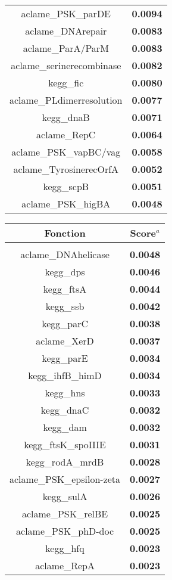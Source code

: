 \begin{table}[H]
\begin{minipage}[t]{0.3\textwidth}
\begin{scriptsize}
\begin{tabular}{c>{\bfseries}c}
aclame\_PSK\_parDE&0.0094\\
aclame\_DNArepair&0.0083\\
aclame\_ParA/ParM&0.0083\\
aclame\_serinerecombinase&0.0082\\
kegg\_fic&0.0080\\
aclame\_PLdimerresolution&0.0077\\
kegg\_dnaB&0.0071\\
aclame\_RepC&0.0064\\
aclame\_PSK\_vapBC/vag&0.0058\\
aclame\_TyrosinerecOrfA&0.0052\\
kegg\_scpB&0.0051\\
aclame\_PSK\_higBA&0.0048\\
\end{tabular}
\end{scriptsize}
\end{minipage}
\hspace{2cm}
\begin{minipage}[t]{0.3\textwidth}
\vspace{0cm}
\centering
\begin{scriptsize}
\begin{tabular}{c>{\bfseries}c}
Fonction & Score$^{a}$\\
\hline
\\[-0.2cm]
aclame\_DNAhelicase&0.0048\\
kegg\_dps&0.0046\\
kegg\_ftsA&0.0044\\
kegg\_ssb&0.0042\\
kegg\_parC&0.0038\\
aclame\_XerD&0.0037\\
kegg\_parE&0.0034\\
kegg\_ihfB\_himD&0.0034\\
kegg\_hns&0.0033\\
kegg\_dnaC&0.0032\\
kegg\_dam&0.0032\\
kegg\_ftsK\_spoIIIE&0.0031\\
kegg\_rodA\_mrdB&0.0028\\
aclame\_PSK\_epsilon-zeta&0.0027\\
kegg\_sulA&0.0026\\
aclame\_PSK\_relBE&0.0025\\
aclame\_PSK\_phD-doc&0.0025\\
kegg\_hfq&0.0023\\
aclame\_RepA&0.0023\\

\end{tabular}
\end{scriptsize}
\end{minipage}
\end{table}
